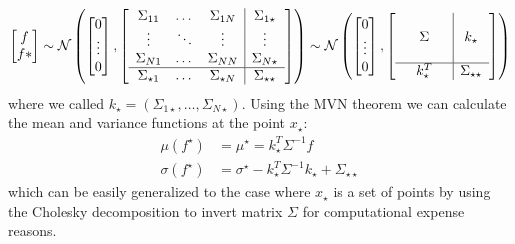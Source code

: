\documentclass{article}
\begin{document}
\begin{align*}
    \begin{bmatrix}
    f \\
    f*
    \end{bmatrix}
    \sim
    \mathcal{N}
    \begin{pmatrix}
    \begin{bmatrix}
    0    \\    \vdots    \\    0
    \end{bmatrix}
    ,
    \begin{bmatrix}
    \begin{array}{c c c|c}
        \Sigma_{11} & \dots & \Sigma_{1N} & \Sigma_{1\star} \\
        \vdots &\ddots & \vdots & \vdots \\
        \Sigma_{N1} & \dots & \Sigma_{NN} & \Sigma_{N\star} \\
        \hline
        \Sigma_{\star 1} & \dots & \Sigma_{\star N} & \Sigma_{\star \star}
    \end{array}
    \end{bmatrix}
    \end{pmatrix}
    \sim
    \mathcal{N}
    \begin{pmatrix}
    \begin{bmatrix}
    0    \\    \vdots    \\    0
    \end{bmatrix}
    ,
    \begin{bmatrix}
    \begin{array}{c c c|c}
         &  & &  \\
         & \Sigma & & k_\star \\
         &  &  &  \\
        \hline
         & k^T_\star &  & \Sigma_{\star \star}
    \end{array}
    \end{bmatrix}
    \end{pmatrix}
\end{align*}
where we called $k_\star = (\Sigma_{1\star}, \dots, \Sigma_{N\star})$.
Using the MVN theorem we can calculate the mean and variance functions at the point $x_{\star}$:
\begin{align}
\label{GP}
    \mu(f^\star) &= \mu^\star = k_\star^T \Sigma^{-1} f \\
    \sigma(f^\star) &= \sigma^\star -k_\star^T \Sigma^{-1} k_\star + \Sigma_{\star \star}
\end{align}
which can be easily generalized to the case where $x_\star$ is a set of points by using the Cholesky decomposition to invert matrix $\Sigma$ for computational expense reasons. 
\end{document}
